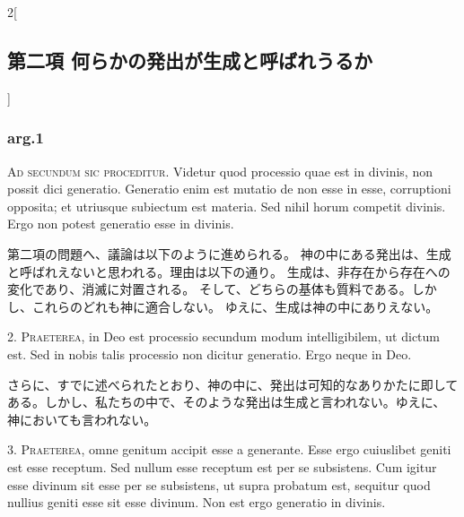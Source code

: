 \documentclass[paper=a4paper,fontsize=10pt,jafontsize=9pt,titlepage]{jlreq}
\begin{document}
\begin{paracol}{2}[\subsection{第二項 何らかの発出が生成と呼ばれうるか}]

\subsubsection{arg.1}

{\scshape Ad secundum sic proceditur}. Videtur quod processio quae est in divinis,
non possit dici generatio. Generatio enim est mutatio de non esse in
esse, corruptioni opposita; et utriusque subiectum est materia. Sed
nihil horum competit divinis. Ergo non potest generatio esse in divinis.


\switchcolumn


第二項の問題へ、議論は以下のように進められる。
神の中にある発出は、生成と呼ばれえないと思われる。理由は以下の通り。
生成は、非存在から存在への変化であり、消滅に対置される。
そして、どちらの基体も質料である。しかし、これらのどれも神に適合しない。
ゆえに、生成は神の中にありえない。




2. {\scshape Praeterea}, in Deo est processio secundum modum intelligibilem, ut dictum
est. Sed in nobis talis processio non dicitur generatio. Ergo neque in
Deo.


\switchcolumn


さらに、すでに述べられたとおり、神の中に、発出は可知的なありかたに即して
 ある。しかし、私たちの中で、そのような発出は生成と言われない。ゆえに、
 神においても言われない。




3. {\scshape Praeterea}, omne genitum accipit esse a generante. Esse ergo cuiuslibet
geniti est esse receptum. Sed nullum esse receptum est per se
subsistens. Cum igitur esse divinum sit esse per se subsistens, ut supra
probatum est, sequitur quod nullius geniti esse sit esse divinum. Non
est ergo generatio in divinis.


\switchcolumn



\end{paracol}
\end{document}
